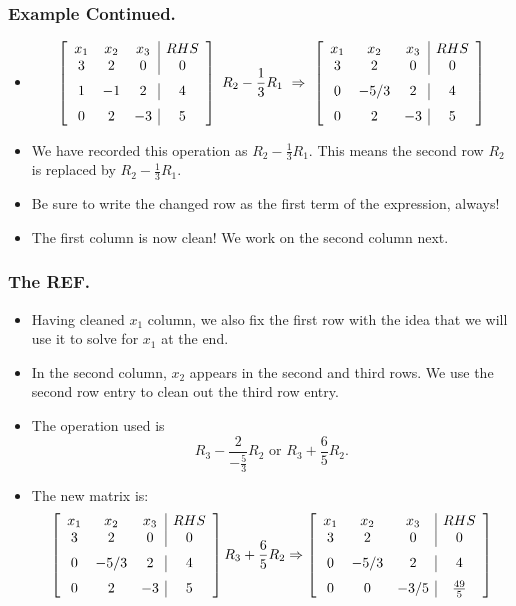 \begin{frame}%
  \frametitle{Example Continued.}
  \begin{itemize}%
\item
$$\left[ \begin {array}{ccc|c}
x_1 & x_2 & x_3 & RHS\\
3&2&0&0\\\noalign{\medskip}
1&-1&2&4\\\noalign{\medskip}
0&2&-3&5\end {array} \right]
~R_2-\frac{1}{3}R_1 ~\Rightarrow~
 \left[ \begin {array}{ccc|c}
x_1 & x_2 & x_3 & RHS\\
3&2&0&0\\\noalign{\medskip}
0&-5/3&2&4\\\noalign{\medskip}
0&2&-3&5\end {array} \right]
$$
\item We have recorded this operation as $R_2-\frac{1}{3}R_1$. This
means the second row $R_2$ is replaced by $R_2-\frac{1}{3}R_1$.

\item Be sure to write the changed row as the first term of the
expression, always!

\item The first column is now clean! We work on the second column next.

\end{itemize}
\end{frame}
\begin{frame}%
  \frametitle{The REF.}
  \begin{itemize}%

\item Having cleaned $x_1$ column, we also fix the first row with the
idea that we will use it to solve for $x_1$ at the end.

\item In the second column, $x_2$ appears in the second and third rows.
We use the second row entry to clean out the third row entry.

\item The operation used is
$$R_3 - \frac{2}{-\frac{5}{3}}R_2 \mbox{ or } R_3 + \frac{6}{5}R_2.$$

\item The new matrix is:
$$\left[ \begin {array}{ccc|c}
x_1 & x_2 & x_3 & RHS\\
3&2&0&0\\\noalign{\medskip}
0&-5/3&2&4\\\noalign{\medskip}
0&2&-3&5\end {array} \right]
 R_3 + \frac{6}{5}R_2\Rightarrow
\left[ \begin {array}{ccc|c}
x_1 & x_2 & x_3 & RHS\\
3&2&0&0\\\noalign{\medskip}
0&-5/3&2&4\\\noalign{\medskip}
0&0&-3/5&{\frac {49}{5}}\end {array} \right]
$$
\end{itemize}
\end{frame}
